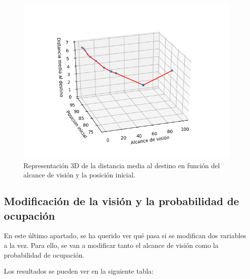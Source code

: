 \documentclass[11pt,a4paper]{report}
\begin{document}
\begin{figure}[H]
\centering
\includegraphics[scale=0.5]{img/aparc-vis-3d.png}
\caption{Representación 3D de la distancia media al destino en función del alcance de visión y
la posición inicial.}
\label{aparc-3d-vis}
\end{figure}

\subsection{Modificación de la visión y la probabilidad de ocupación}

En este último apartado, se ha querido ver qué pasa si se modifican dos variables a la vez. Para ello, se van a
modificar tanto el alcance de visión como la probabilidad de ocupación.

Los resultados se pueden ver en la siguiente tabla:
\end{document}
